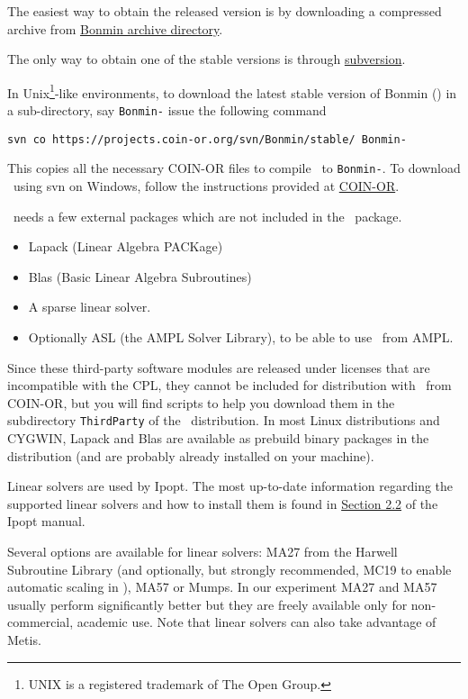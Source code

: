 The easiest way to obtain the released version is by downloading a compressed archive from \href{http://www.coin-or.org/Tarballs/Bonmin/}{Bonmin archive directory}.

The only way to obtain one of the stable versions is through \href{http://subversion.tigris.org/}{subversion}.

In Unix\footnote{UNIX is a registered trademark of The Open
Group.}-like environments, to download the latest stable version of Bonmin (\stableVersion) in a sub-directory, say {\tt Bonmin-\stableVersion} 
issue the following command
\begin{center}
\tt \small svn co
https://projects.coin-or.org/svn/Bonmin/stable/\stableVersion\ Bonmin-\stableVersion
\end{center}

\noindent This copies all the necessary COIN-OR files to compile \Bonmin\ to
{\tt Bonmin-\stableVersion}. To download \Bonmin\ using svn on Windows,
follow the instructions provided at
\href{http://www.coin-or.org/faqs.html\#q4}{COIN-OR}.

\Bonmin\ needs a few external packages which are not included in the \Bonmin\ package.
\begin{itemize}
\item Lapack (Linear Algebra PACKage)
\item Blas (Basic Linear Algebra Subroutines)
\item A sparse linear solver.
\item Optionally ASL (the AMPL Solver Library), to be able to use \Bonmin\ from AMPL.
\end{itemize}


Since these third-party software modules are released under licenses
that are incompatible with the CPL, they cannot be included for
distribution with \Bonmin\ from COIN-OR, but you will find scripts
to help you download them in the subdirectory {\tt ThirdParty} of
the \Bonmin\ distribution. In most Linux distributions and
CYGWIN, Lapack and Blas are available as prebuild binary packages in
the distribution (and are probably already installed on your
machine). 

Linear solvers are used by Ipopt. The most up-to-date information regarding the supported linear solvers and how to install them is found in \href{http://www.coin-or.org/Ipopt/documentation/node13.html}{Section 2.2} of the Ipopt manual.

Several options are available for linear solvers: MA27 from the Harwell Subroutine Library (and optionally, but strongly recommended, MC19 to enable automatic scaling in \Ipopt), MA57 or Mumps.
In our experiment MA27 and MA57 usually perform significantly better but they are freely 
available only for non-commercial, academic use. Note that linear solvers can also take advantage of Metis.
